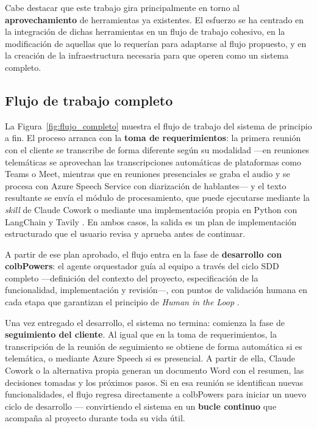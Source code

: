 \documentclass[11pt, letterpaper]{article}
\begin{document}
Cabe destacar que este trabajo gira principalmente en torno al \textbf{aprovechamiento} de herramientas ya existentes. El esfuerzo se ha centrado en la integración de dichas herramientas en un flujo de trabajo cohesivo, en la modificación de aquellas que lo requerían para adaptarse al flujo propuesto, y en la creación de la infraestructura necesaria para que operen como un sistema completo.

\subsection{Flujo de trabajo completo}
\label{sec:flujo_completo}

La Figura~\ref{fig:flujo_completo} muestra el flujo de trabajo del sistema de principio a fin. El proceso arranca con la \textbf{toma de requerimientos}: la primera reunión con el cliente se transcribe de forma diferente según su modalidad ---en reuniones telemáticas se aprovechan las transcripciones automáticas de plataformas como Teams o Meet, mientras que en reuniones presenciales se graba el audio y se procesa con Azure Speech Service \cite{azure_speech_2024} con diarización de hablantes--- y el texto resultante se envía el módulo de procesamiento, que puede ejecutarse mediante la \textit{skill} de Claude Cowork o mediante una implementación propia en Python con LangChain y Tavily \cite{tavily_2025}. En ambos casos, la salida es un plan de implementación estructurado que el usuario revisa y aprueba antes de continuar.

A partir de ese plan aprobado, el flujo entra en la fase de \textbf{desarrollo con colbPowers}: el agente orquestador guía al equipo a través del ciclo SDD completo ---definición del contexto del proyecto, especificación de la funcionalidad, implementación y revisión---, con puntos de validación humana en cada etapa que garantizan el principio de \textit{Human in the Loop} \cite{vaithilingam_2022}.

Una vez entregado el desarrollo, el sistema no termina: comienza la fase de \textbf{seguimiento del cliente}. Al igual que en la toma de requerimientos, la transcripción de la reunión de seguimiento se obtiene de forma automática si es telemática, o mediante Azure Speech si es presencial. A partir de ella, Claude Cowork o la alternativa propia generan un documento Word con el resumen, las decisiones tomadas y los próximos pasos. Si en esa reunión se identifican nuevas funcionalidades, el flujo regresa directamente a colbPowers para iniciar un nuevo ciclo de desarrollo --- convirtiendo el sistema en un \textbf{bucle continuo} que acompaña al proyecto durante toda su vida útil.
\end{document}

